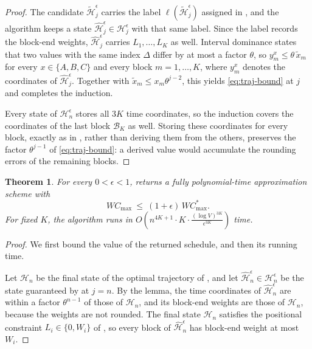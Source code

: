 \documentclass[12pt]{article}
\newtheorem{theorem}{Theorem}[section]
\begin{document}
\begin{sloppypar}
\begin{proof}
The candidate $\tilde{\mathscr{H}}^{\epsilon}_{j}$ carries the label
$\ell(\tilde{\mathscr{H}}^{\epsilon}_{j})$ assigned in , and the algorithm
keeps a state $\hat{\mathscr{H}}^{\epsilon}_{j}\in\mathscr{H}^{\epsilon}_{j}$ with that same label.
Since the label records the block-end weights, $\hat{\mathscr{H}}^{\epsilon}_{j}$ carries
$L_1,\dots,L_K$ as well. Interval dominance states that two values with the same index $\Delta$
differ by at most a factor $\theta$, so $y^{x}_{m}\le\theta\,\tilde x_{m}$ for every
$x\in\{A,B,C\}$ and every block $m=1,\dots,K$, where $y^{x}_{m}$ denotes the coordinates of
$\hat{\mathscr{H}}^{\epsilon}_{j}$. Together with $\tilde x_m\le x_m\theta^{j-2}$, this yields
\cref{eq:traj-bound} at $j$ and completes the induction.

Every state of $\mathscr{H}^{\epsilon}_n$ stores all $3K$ time coordinates, so the induction covers
the coordinates of the last block $\mathcal{B}_K$ as well. Storing these coordinates for every
block, exactly as in , rather than deriving them from the others, preserves
the factor $\theta^{j-1}$ of \cref{eq:traj-bound}: a derived value would accumulate the rounding
errors of the remaining blocks.
\end{proof}

\begin{theorem}\label{thm:fptas}
For every $0<\epsilon<1$,  returns a fully polynomial-time approximation scheme with
\[
W C_{\max}\ \le\ (1+\epsilon)\,W C_{\max}^{*}.
\]
For fixed $K$, the algorithm runs in
$
O\!\left(n^{4K+1}\cdot K\cdot\frac{(\log V)^{3K}}{\epsilon^{3K}}\right)
$
time.
\end{theorem}

\begin{proof}
We first bound the value of the returned schedule, and then its running time.

Let $\mathscr{H}_{n}$ be the final state of the optimal trajectory of , and let
$\hat{\mathscr{H}}^{\epsilon}_{n}\in\mathscr{H}^{\epsilon}_{n}$ be the state guaranteed by
 at $j=n$. By the lemma, the time coordinates of
$\hat{\mathscr{H}}^{\epsilon}_{n}$ are within a factor $\theta^{n-1}$ of those of $\mathscr{H}_{n}$,
and its block-end weights are those of $\mathscr{H}_{n}$, because the weights are not rounded. The
final state $\mathscr{H}_{n}$ satisfies the positional constraint $L_i\in\{0,W_i\}$ of
, so every block of $\hat{\mathscr{H}}^{\epsilon}_{n}$ has block-end weight at
most $W_i$.


\end{proof}
\end{sloppypar}
\end{document}
